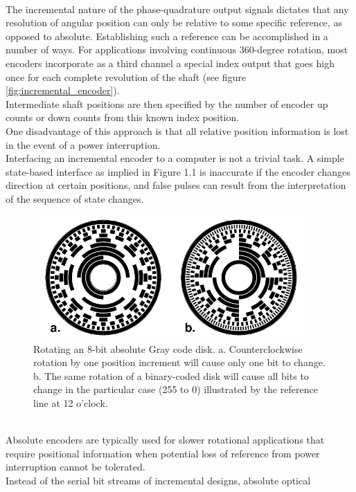 \\
The incremental nature of the phase-quadrature output signals dictates that
any resolution of angular position can only be relative to some specific
reference, as opposed to absolute. Establishing such a reference can be
accomplished in a number of ways. For applications involving continuous
360-degree rotation, most encoders incorporate as a third channel a special
index output that goes high once for each complete revolution of the shaft
(see figure \ref{fig:incremental_encoder}).
\\
Intermediate shaft positions are then specified by the number of encoder
up counts or down counts from this known index position.
\\
One disadvantage of this approach is that all relative position information
is lost in the event of a power interruption.
\\
Interfacing an incremental encoder to a computer is not a trivial task.
A simple state-based interface as implied in Figure 1.1 is inaccurate if
the encoder changes direction at certain positions, and false pulses can
result from the interpretation of the sequence of state changes.
\begin{figure} [!h]
  \begin{center}
    \includegraphics[width=300pt]{img/absolute_encoder.png}
    \caption{Rotating an 8-bit absolute Gray code disk.
      a. Counterclockwise rotation by one position increment will cause
      only one bit to change.
      b. The same rotation of a binary-coded disk will cause all bits to
      change in the particular case (255 to 0) illustrated by the
      reference line at 12 o'clock.}
    \label{fig:absolute_encoder}
  \end{center}
\end{figure}
\\
Absolute encoders are typically used for slower rotational applications
that require positional information when potential loss of reference
from power interruption cannot be tolerated.
\\
Instead of the serial bit streams of incremental designs, absolute optical

